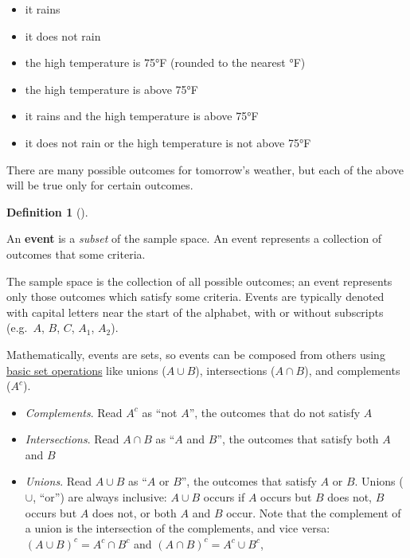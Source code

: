 \documentclass[
  letterpaper,
  DIV=11,
  numbers=noendperiod]{scrreprt}
\providecommand{\tightlist}{%
  \setlength{\itemsep}{0pt}\setlength{\parskip}{0pt}}
\theoremstyle{plain}
\theoremstyle{definition}
\theoremstyle{definition}
\theoremstyle{definition}
\newtheorem{definition}{Definition}[chapter]
\theoremstyle{remark}
\begin{document}
\begin{itemize}
\tightlist
\item
  it rains
\item
  it does not rain
\item
  the high temperature is 75°F (rounded to the nearest °F)
\item
  the high temperature is above 75°F
\item
  it rains and the high temperature is above 75°F
\item
  it does not rain or the high temperature is not above 75°F
\end{itemize}

There are many possible outcomes for tomorrow's weather, but each of the
above will be true only for certain outcomes.

\begin{definition}[]\protect\hypertarget{def-event}{}\label{def-event}

An \textbf{event} is a \emph{subset} of the sample space.
An event represents a collection of outcomes that some criteria.

\end{definition}

The sample space is the collection of all possible outcomes; an event
represents only those outcomes which satisfy some criteria. Events are
typically denoted with capital letters near the start of the alphabet,
with or without subscripts (e.g.~\(A\), \(B\), \(C\), \(A_1\), \(A_2\)).

Mathematically, events are sets, so events can be composed from others
using
\href{https://en.wikipedia.org/wiki/Set_(mathematics)\#Basic_operations}{basic
set operations} like unions (\(A\cup B\)), intersections (\(A \cap B\)),
and complements (\(A^c\)).

\begin{itemize}
\tightlist
\item
  \emph{Complements}. Read \(A^c\) as ``not \(A\)'', the outcomes that
  do not satisfy \(A\)
\item
  \emph{Intersections}. Read \(A\cap B\) as ``\(A\) and \(B\)'', the
  outcomes that satisfy both \(A\) and \(B\)
\item
  \emph{Unions}. Read \(A \cup B\) as ``\(A\) or \(B\)'', the outcomes
  that satisfy \(A\) or \(B\). Unions (\(\cup\), ``or'') are always
  inclusive: \(A\cup B\) occurs if \(A\) occurs but \(B\) does not,
  \(B\) occurs but \(A\) does not, or both \(A\) and \(B\) occur. Note
  that the complement of a union is the intersection of the complements,
  and vice versa: \((A \cup B)^c = A^c \cap B^c\) and
  \((A \cap B)^c = A^c \cup B^c\),
\end{itemize}
\end{document}
